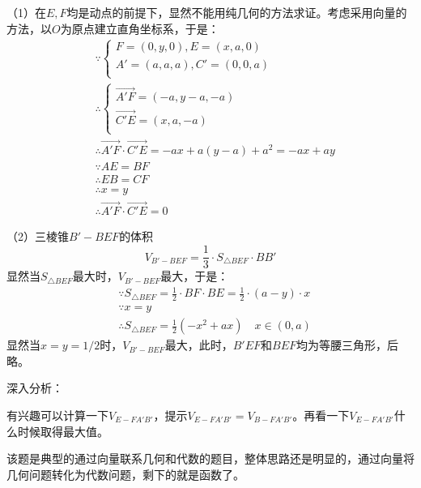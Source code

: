（1）在$E,F$均是动点的前提下，显然不能用纯几何的方法求证。考虑采用向量的方法，以$O$为原点建立直角坐标系，于是：
\begin{align*}
&\because \begin{cases}
	F=\left( 0,y,0 \right) ,E=\left( x,a,0 \right)\\
	A'=\left( a,a,a \right) ,C'=\left( 0,0,a \right)\\
\end{cases} \\
&\therefore \begin{cases}
	\overrightarrow{A'F}=\left( -a,y-a,-a \right)\\
	\overrightarrow{C'E}=\left( x,a,-a \right)\\
\end{cases} \\
&\therefore \overrightarrow{A'F}\cdot \overrightarrow{C'E}=-ax+a\left( y-a \right) +a^2=-ax+ay \\
&\because AE=BF \\
&\therefore EB=CF \\
&\therefore x=y \\
&\therefore \overrightarrow{A'F}\cdot \overrightarrow{C'E}=0
\end{align*}

（2）三棱锥$B'-BEF$的体积
\[
V_{B'-BEF}=\frac{1}{3}\cdot S_{\bigtriangleup BEF}\cdot BB'
\]
显然当$S_{\bigtriangleup BEF}$最大时，$V_{B'-BEF}$最大，于是：
\begin{align*}
&\because S_{\bigtriangleup BEF}=\frac{1}{2}\cdot BF\cdot BE=\frac{1}{2}\cdot \left( a-y \right) \cdot x\\
&\because x=y \\
&\therefore S_{\bigtriangleup BEF}=\frac{1}{2}\left( -x^2+ax \right) \quad x\in \left( 0,a \right)
\end{align*}
显然当$x=y=1/2$时，$V_{B'-BEF}$最大，此时，$B'EF$和$BEF$均为等腰三角形，后略。

深入分析：

有兴趣可以计算一下$V_{E-FA'B'}$，提示$V_{E-FA'B'}=V_{B-FA'B'}$。再看一下$V_{E-FA'B'}$什么时候取得最大值。

\begin{tcolorbox}
该题是典型的通过向量联系几何和代数的题目，整体思路还是明显的，通过向量将几何问题转化为代数问题，剩下的就是函数了。
\end{tcolorbox}




